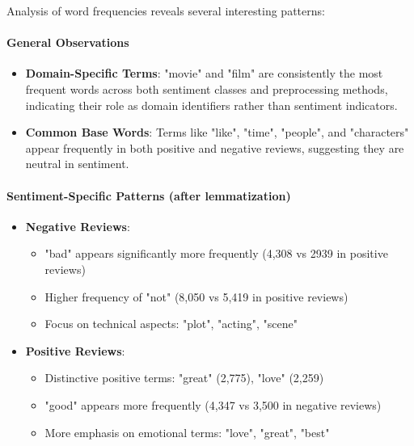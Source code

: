 \documentclass[12pt]{article}
\begin{document}
Analysis of word frequencies reveals several interesting patterns:

\paragraph{General Observations}
\begin{itemize}
    \item \textbf{Domain-Specific Terms}: "movie" and "film" are consistently the most frequent words across both sentiment classes and preprocessing methods, indicating their role as domain identifiers rather than sentiment indicators.
    
    \item \textbf{Common Base Words}: Terms like "like", "time", "people", and "characters" appear frequently in both positive and negative reviews, suggesting they are neutral in sentiment.
\end{itemize}

\paragraph{Sentiment-Specific Patterns (after lemmatization)}
\begin{itemize}
    \item \textbf{Negative Reviews}:
        \begin{itemize}
            \item "bad" appears significantly more frequently (4,308 vs 2939 in positive reviews)
            \item Higher frequency of "not" (8,050 vs 5,419 in positive reviews)
            \item Focus on technical aspects: "plot", "acting", "scene"
        \end{itemize}
    
    \item \textbf{Positive Reviews}:
        \begin{itemize}
            \item Distinctive positive terms: "great" (2,775), "love" (2,259)
            \item "good" appears more frequently (4,347 vs 3,500 in negative reviews)
            \item More emphasis on emotional terms: "love", "great", "best"
        \end{itemize}
\end{itemize}
\end{document}
